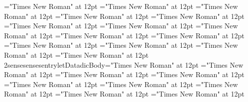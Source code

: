 \documentclass{article}
\begin{document}
 
\font\xsensenumberLbsensesensesentryletDatadicBody="Times New Roman" at 12pt
\font\xlanguagetagxitemrelationantonymsensesensesentryletDatadicBody="Times New Roman" at 12pt
\font\xitemrelationantonymsensesensesentryletDatadicBody="Times New Roman" at 12pt
\font\relationantonymbeforesensesensesentryletDatadicBody="Times New Roman" at 12pt
\font\relationantonymsensesensesentryletDatadicBody="Times New Roman" at 12pt
\font\slotnameslotsgrammaticalinfosensesensesentryletDatadicBody="Times New Roman" at 12pt
\font\xlanguagetagxitemdefinitionLbsensesensesentryletDatadicBody="Times New Roman" at 12pt
\font\xitemdefinitionLbsensesensesentryletDatadicBody="Times New Roman" at 12pt
\font{}="Times New Roman" at 12pt
\font\slotnamexitemslotsgrammaticalinfosensesensesentryletDatadicBody="Times New Roman" at 12pt
\font\xitemslotsgrammaticalinfosensesensesentryletDatadicBody="Times New Roman" at 12pt
\font\slotsgrammaticalinfosensesensesentryletDatadicBody="Times New Roman" at 12pt
\font\partofspeechgrammaticalinfosensesensesentryletDatadicBody="Times New Roman" at 12pt
\font\grammaticalinfosensesensesentryletDatadicBody="Times New Roman" at 12pt
\font\xsensenumberL2sensesensesentryletDatadicBody="Times New Roman" at 12pt
\font\sensesensesentryletDatadicBody="Times New Roman" at 12pt
\font\sensesentryletDatadicBody="Times New Roman" at 12pt
\font\xhomographnumberheadwordentryletDatadicBody="Times New Roman" at 12pt
\font\headwordentryletDatadicBody="Times New Roman" at 12pt
\font\entryletDatadicBody="Times New Roman" at 12pt
\font{}="Times New Roman" at 12pt
\font{}="Times New Roman" at 12pt
\font{}="Times New Roman" at 12pt

\end{document}
